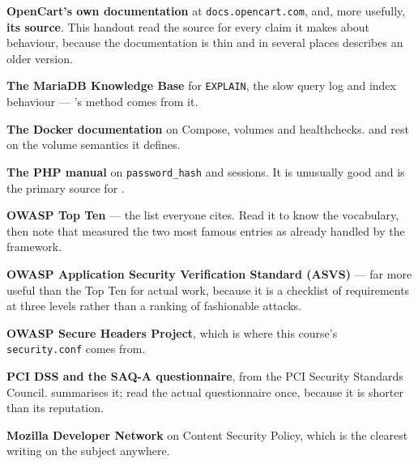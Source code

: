 \begin{examplebox}
\begin{tight}
  \item \textbf{OpenCart's own documentation} at \texttt{docs.opencart.com},
        and, more usefully, \textbf{its source}. This handout read the source
        for every claim it makes about behaviour, because the documentation is
        thin and in several places describes an older version.
  \item \textbf{The MariaDB Knowledge Base} for \texttt{EXPLAIN}, the slow
        query log and index behaviour --- 's method comes
        from it.
  \item \textbf{The Docker documentation} on Compose, volumes and healthchecks.
         and  rest on the volume semantics it
        defines.
  \item \textbf{The PHP manual} on \texttt{password\_hash} and sessions. It is
        unusually good and is the primary source for .
\end{tight}
\end{examplebox}

\begin{examplebox}
\begin{tight}
  \item \textbf{OWASP Top Ten} --- the list everyone cites. Read it to know the
        vocabulary, then note that  measured the two most
        famous entries as already handled by the framework.
  \item \textbf{OWASP Application Security Verification Standard (ASVS)} ---
        far more useful than the Top Ten for actual work, because it is a
        checklist of requirements at three levels rather than a ranking of
        fashionable attacks.
  \item \textbf{OWASP Secure Headers Project}, which is where this course's
        \texttt{security.conf} comes from.
  \item \textbf{PCI DSS and the SAQ-A questionnaire}, from the PCI Security
        Standards Council.  summarises it; read the actual
        questionnaire once, because it is shorter than its reputation.
  \item \textbf{Mozilla Developer Network} on Content Security Policy, which
        is the clearest writing on the subject anywhere.
\end{tight}
\end{examplebox}

